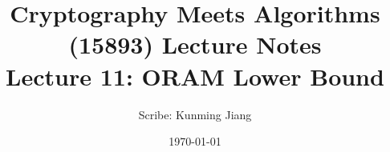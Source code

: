 \documentclass[11pt]{article}
\title{{\Large Cryptography Meets Algorithms (15893) Lecture Notes}\\[5pt]
{\bf Lecture 11: ORAM Lower Bound}}
\author{Scribe: Kunming Jiang}
\date{\today}
\theoremstyle{definition}
\begin{document}
\maketitle


{

}
%



\end{document}

